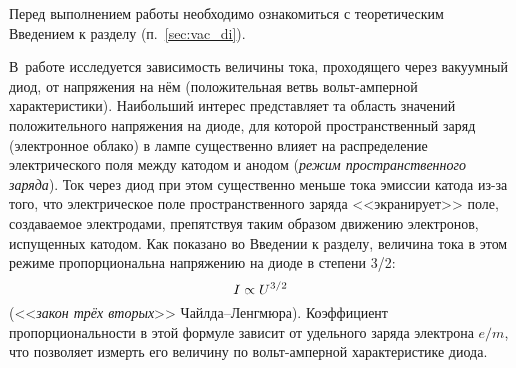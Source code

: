 
Перед выполнением работы необходимо ознакомиться с теоретическим Введением
к разделу (п.~\ref{sec:vac_di}).

%
%

В~работе исследуется зависимость величины тока, проходящего через вакуумный диод,
от напряжения на нём (положительная ветвь вольт-амперной характеристики).
Наибольший интерес представляет та область значений положительного напряжения
на диоде, для которой пространственный заряд (электронное облако) в лампе 
существенно влияет на распределение электрического поля между катодом и анодом
(\emph{режим пространственного заряда}). 
Ток через диод при этом существенно меньше тока эмиссии катода из-за того, 
что электрическое поле пространственного заряда <<экранирует>> поле,
создаваемое электродами, препятствуя таким образом движению электронов, 
испущенных катодом. Как показано во Введении к разделу, величина 
тока в этом режиме пропорциональна напряжению на диоде в степени 3/2:
\begin{equation}
\eqmark{IU}
	I\propto U^{3/2}
\end{equation}
(<<\emph{закон трёх вторых}>> Чайлда--Ленгмюра). 
Коэффициент пропорциональности в этой формуле зависит
от удельного заряда электрона $e/m$, что позволяет измерть его величину
по вольт-амперной характеристике диода.


